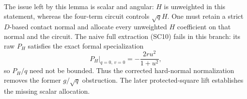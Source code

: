 The issue left by this lemma is scalar and angular: $H$ is unweighted in this
statement, whereas the four-term circuit controls $\sqrt q H$.
One must retain a strict $D$-based contact normal and allocate every
unweighted $H$ coefficient on that normal and the circuit. The
naive full extraction (SC10) fails in this branch: its raw $P_H$
satisfies the exact formal specialization
\[
       P_H\big|_{q=0,\,v=0}=-\frac{2ru^2}{1+u^2},
\]
so $P_H/q$ need not be bounded. Thus the corrected hard-normal
normalization removes the former $g/\sqrt q$ obstruction. The later
protected-square lift establishes the missing scalar allocation.
